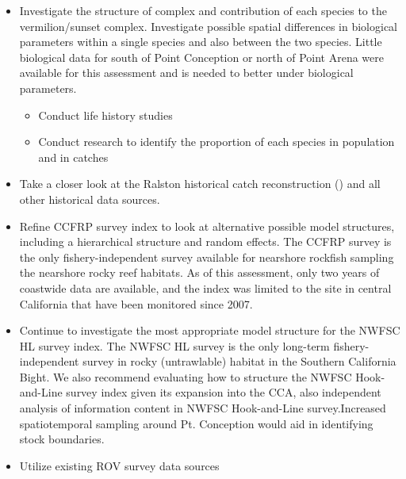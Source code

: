 \documentclass[
  english,
  a4paper,
]{article}
\providecommand{\tightlist}{%
  \setlength{\itemsep}{0pt}\setlength{\parskip}{0pt}}
\begin{document}
\begin{itemize}
\item
  Investigate the structure of complex and contribution of each species to the
  vermilion/sunset complex. Investigate possible spatial differences in biological parameters within
  a single species and also between the two species. Little biological data for south of
  Point Conception or north of Point Arena were available for this assessment and is needed
  to better under biological parameters.

  \begin{itemize}
  \tightlist
  \item
    Conduct life history studies
  \item
    Conduct research to identify the proportion of each species in population and in catches
  \end{itemize}
\item
  Take a closer look at the Ralston historical catch reconstruction (\cite{Ralston2010}) and
  all other historical data sources.
\item
  Refine CCFRP survey index to look at alternative possible model structures, including
  a hierarchical structure and random effects. The CCFRP survey is the only
  fishery-independent survey available for nearshore rockfish sampling the nearshore rocky
  reef habitats. As of this assessment, only two years of coastwide data are available,
  and the index was limited to the site in central California that have been monitored
  since 2007.
\item
  Continue to investigate the most appropriate model structure for the NWFSC HL survey index.
  The NWFSC HL survey is the only long-term fishery-independent survey in rocky (untrawlable) habitat
  in the Southern California Bight. We also recommend evaluating how to structure the NWFSC Hook-and-Line survey index given its expansion into the CCA, also independent analysis of information content in NWFSC Hook-and-Line survey.Increased spatiotemporal sampling around Pt. Conception would aid in identifying stock boundaries.
\item
  Utilize existing ROV survey data sources


\end{itemize}
\end{document}
